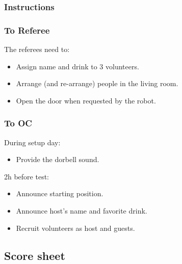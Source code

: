 \subsubsection*{Instructions}

\subsubsection*{To Referee}

The referees need to:
\begin{itemize}
	\item Assign name and drink to 3 volunteers.
	\item Arrange (and re-arrange) people in the living room.
	\item Open the door when requested by the robot.
\end{itemize}

\subsubsection*{To OC}

During setup day:
\begin{itemize}
	\item Provide the dorbell sound.
\end{itemize}

2h before test:
\begin{itemize}
	\item Announce starting position.
	\item Announce host's name and favorite drink.
	\item Recruit volunteers as host and guests.
\end{itemize}

\subsection*{Score sheet}
%


